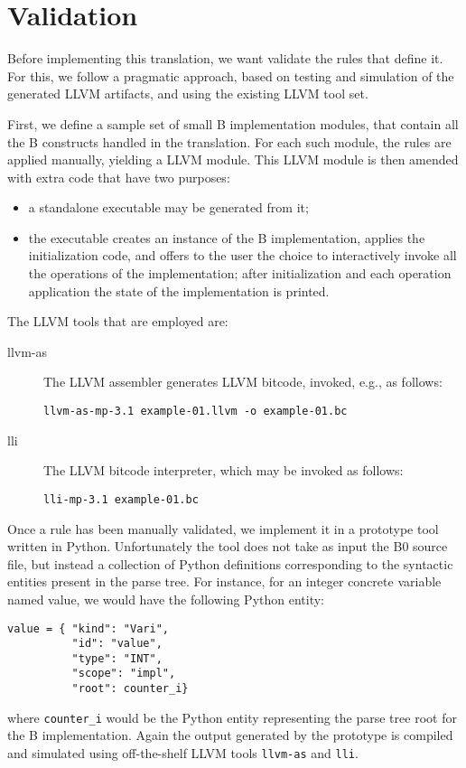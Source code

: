 \documentclass{llncs}
\newcommand{\B}[1]{\textsf{#1}}
\begin{document}
\section{Validation}
\label{sec:validation}

Before implementing this translation, we want validate the rules that define it.
For this, we follow a pragmatic approach, based on testing and simulation of the
generated LLVM artifacts, and using the existing LLVM tool set.  

First, we define a sample set of small B implementation modules, that contain
all the B constructs handled in the translation. For each such module, the rules
are applied manually, yielding a LLVM module. This LLVM module is then amended
with extra code that have two purposes:
\begin{itemize}
\item a standalone executable may be generated from it;
\item the executable creates an instance of the B implementation, applies the
  initialization code, and offers to the user the choice to interactively invoke
  all the operations of the implementation; after initialization and each
  operation application the state of the implementation is printed. 
\end{itemize}

The LLVM tools that are employed are:
\begin{description}
\item[llvm-as] The LLVM assembler generates LLVM bitcode, invoked, e.g., as
  follows:
\begin{verbatim}
llvm-as-mp-3.1 example-01.llvm -o example-01.bc
\end{verbatim}
\item[lli] The LLVM bitcode interpreter, which may be invoked as follows:
\begin{verbatim}
lli-mp-3.1 example-01.bc
\end{verbatim}
\end{description}

Once a rule has been manually validated, we implement it in a prototype tool
written in Python. Unfortunately the tool does not take as input the B0 source
file, but instead a collection of Python definitions corresponding to the
syntactic entities present in the parse tree. For instance, for an integer
concrete variable named \B{value}, we would have the following Python entity:
\begin{verbatim}
value = { "kind": "Vari",
          "id": "value",
          "type": "INT",
          "scope": "impl",
          "root": counter_i}
\end{verbatim}
where \verb'counter_i' would be the Python entity representing the parse tree
root for the B implementation. Again the output generated by the prototype
is compiled and simulated using off-the-shelf LLVM tools \verb'llvm-as' and
\verb'lli'.
\end{document}
